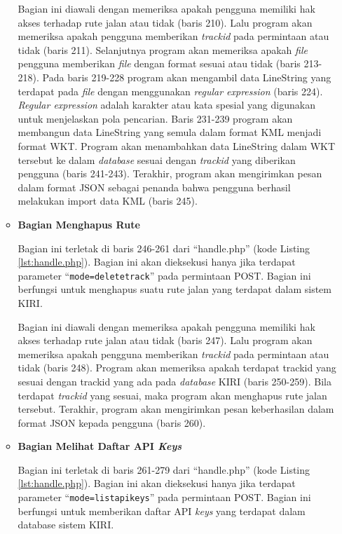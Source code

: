 \documentclass[a4paper,twoside]{article}
\begin{document}
\begin{enumerate}
\begin{itemize}
Bagian ini diawali dengan memeriksa apakah pengguna memiliki hak akses terhadap rute jalan atau tidak (baris 210). Lalu program akan memeriksa apakah pengguna memberikan \textit{trackid} pada permintaan atau tidak (baris 211). Selanjutnya program akan memeriksa apakah \textit{file} pengguna memberikan \textit{file} dengan format sesuai atau tidak (baris 213-218). Pada baris 219-228 program akan mengambil data LineString yang terdapat pada \textit{file} dengan menggunakan \textit{regular expression} (baris 224). \textit{Regular expression} adalah karakter atau kata spesial yang digunakan untuk menjelaskan pola pencarian\cite{regex}. Baris 231-239 program akan membangun data LineString yang semula dalam format KML menjadi format WKT. Program akan menambahkan data LineString dalam WKT tersebut ke dalam \textit{database} sesuai dengan \textit{trackid} yang diberikan pengguna (baris 241-243). Terakhir, program akan mengirimkan pesan dalam format JSON sebagai penanda bahwa pengguna berhasil melakukan import data KML (baris 245).

\item \textbf{Bagian Menghapus Rute}

Bagian ini terletak di baris 246-261 dari ``handle.php'' (kode Listing \ref{lst:handle.php}). Bagian ini akan dieksekusi hanya jika terdapat parameter ``\texttt{mode=deletetrack}'' pada permintaan POST. Bagian ini berfungsi untuk menghapus suatu rute jalan yang terdapat dalam sistem KIRI.

Bagian ini diawali dengan memeriksa apakah pengguna memiliki hak akses terhadap rute jalan atau tidak (baris 247). Lalu program akan memeriksa apakah pengguna memberikan \textit{trackid} pada permintaan atau tidak (baris 248). Program akan memeriksa apakah terdapat {trackid} yang sesuai dengan {trackid} yang ada pada \textit{database} KIRI (baris 250-259). Bila terdapat \textit{trackid} yang sesuai, maka program akan menghapus rute jalan tersebut. Terakhir, program akan mengirimkan pesan keberhasilan dalam format JSON kepada pengguna (baris 260).

\item \textbf{Bagian Melihat Daftar API \textit{Keys}}

Bagian ini terletak di baris 261-279 dari ``handle.php'' (kode Listing \ref{lst:handle.php}). Bagian ini akan dieksekusi hanya jika terdapat parameter ``\texttt{mode=listapikeys}'' pada permintaan POST. Bagian ini berfungsi untuk memberikan daftar API \textit{keys} yang terdapat dalam database sistem KIRI.


\end{itemize}
\end{enumerate}
\end{document}
